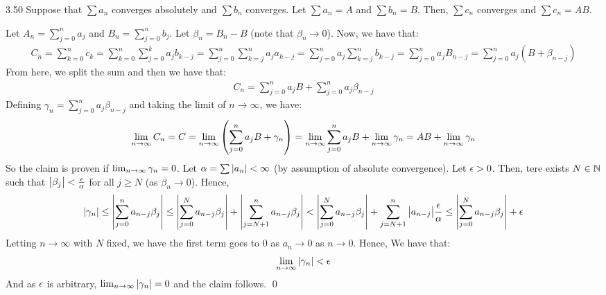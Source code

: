 \setcounter{rudin}{49}
\begin{theorem}{}{3.50}
    Suppose that $\sum a_n$ converges absolutely and $\sum b_n$ converges. Let $\sum a_n = A$ and $\sum b_n = B$. Then, $\sum c_n$ converges and $\sum c_n = AB$.
\end{theorem}
\begin{nproof}
    Let $A_n = \sum_{j=0}^n a_j$ and $B_n = \sum_{j=0}^n b_j$. Let $\beta_n = B_n - B$ (note that $\beta_n \rightarrow 0$). Now, we have that:
    \begin{align*}
        C_n  = \sum_{k=0}^n c_k = \sum_{k=0}^n \sum_{j=0}^k a_j b_{k-j} = \sum_{j=0}^n \sum_{k=j}^n a_j a_{k-j} = \sum_{j=0}^n a_j \sum_{k=j}^n b_{k-j} = \sum_{j=0}^n a_j B_{n-j} = \sum_{j=0}^n a_j(B + \beta_{n-j})
    \end{align*}
    From here, we split the sum and then we have that:
    \begin{align*}
        C_n = \sum_{j=0}^n a_jB + \sum_{j=0}^n a_j\beta_{n-j}
    \end{align*}
    Defining $\gamma_n = \sum_{j=0}^n a_j\beta_{n-j}$ and taking the limit of $n \rightarrow \infty$, we have:
    \begin{align*}
        \lim_{n \rightarrow \infty} C_n = C = \lim_{n \rightarrow \infty} \left(\sum_{j=0}^n a_jB + \gamma_n\right) = \lim_{n \rightarrow \infty} \sum_{j=0}^n a_jB + \lim_{n \rightarrow \infty} \gamma_n = AB + \lim_{n \rightarrow \infty} \gamma_n
    \end{align*}
    So the claim is proven if $\lim_{n \rightarrow \infty} \gamma_n = 0$. Let $\alpha = \sum \abs{a_n} < \infty$ (by assumption of absolute convergence). Let $\epsilon > 0$. Then, tere exists $N \in \mathbb{N}$ such that $\abs{\beta_j} < \frac{\epsilon}{\alpha}$ for all $j \geq N$ (as $\beta_n \rightarrow 0$). Hence, 
    \begin{align*}
        \abs{\gamma_n} \leq \abs{\sum_{j=0}^n a_{n-j}\beta_j} \leq \abs{\sum_{j=0}^N a_{n-j}\beta_j} + \abs{\sum_{j=N+1}^n a_{n-j}\beta_j} < \abs{\sum_{j=0}^N a_{n-j}\beta_j} + \sum_{j=N+1}^n\abs{a_{n-j}}\frac{\epsilon}{\alpha} \leq \abs{\sum_{j=0}^N a_{n-j}\beta_j} + \epsilon
    \end{align*}
    Letting $n \rightarrow \infty$ with $N$ fixed, we have the first term goes to $0$ as $a_n \rightarrow 0$ as $n \rightarrow 0$. Hence, We have that:
    \begin{align*}
        \lim_{n \rightarrow \infty} \abs{\gamma_n} < \epsilon
    \end{align*}
    And as $\epsilon$ is arbitrary, $\lim_{n \rightarrow \infty} \abs{\gamma_n} = 0$ and the claim follows. \qed
\end{nproof}






